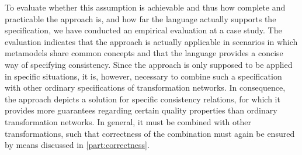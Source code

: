 To evaluate whether this assumption is achievable and thus how complete and practicable the approach is, and how far the language actually supports the specification, we have conducted an empirical evaluation at a case study.
The evaluation indicates that the approach is actually applicable in scenarios in which metamodels share common concepts and that the language provides a concise way of specifying consistency.
Since the approach is only supposed to be applied in specific situations, it is, however, necessary to combine such a specification with other ordinary specifications of transformation networks.
In consequence, the \commonalities approach depicts a solution for specific consistency relations, for which it provides more guarantees regarding certain quality properties than ordinary transformation networks.
In general, it must be combined with other transformations, such that correctness of the combination must again be ensured by means discussed in \autoref{part:correctness}.








